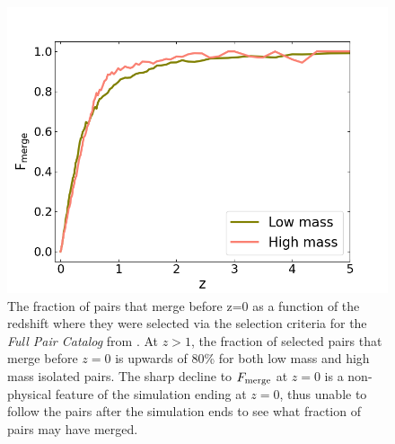 \documentclass[twocolumn]{aastex631}
\newcommand{\paircat}{\textit{Full Pair Catalog}}
\begin{document}
\begin{figure}[htb]
    \centering
    \includegraphics[width=\columnwidth]{plots/bet-on-it/1_fmerge_comp.png}
    \caption{The fraction of pairs that merge before z=0 as a function of the redshift where they were selected via the selection criteria for the \paircat{} from \citet{Chamberlain2024}. At $z>1$, the fraction of selected pairs that merge before $z=0$ is upwards of 80\% for both low mass and high mass isolated pairs. The sharp decline to $F_{\rm merge}$ at $z=0$ is a non-physical feature of the simulation ending at $z=0$, thus unable to follow the pairs after the simulation ends to see what fraction of pairs may have merged.}
    \label{fig:fmerge}
\end{figure}
\end{document}
